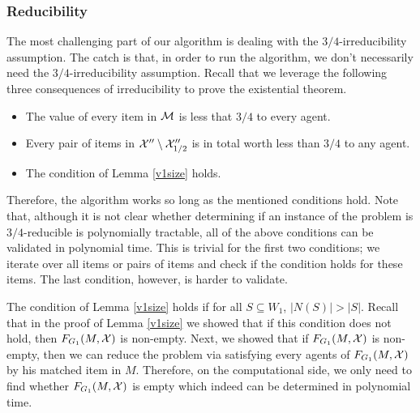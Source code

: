 \subsubsection{Reducibility}\label{irre}
The most challenging part of our algorithm is dealing with the $3/4$-irreducibility assumption. The catch is that, in order to run the algorithm, we don't necessarily need the $3/4$-irreducibility assumption. Recall that we leverage the following three consequences of irreducibility to prove the existential theorem.
\begin{itemize}
	\item The value of every item in $\mathcal{M}$ is less that $3/4$ to every agent.
	\item Every pair of items in $\mathcal{X}'' \setminus \mathcal{X}''_{1/2}$ is in total worth less than $3/4$ to any agent.
	\item The condition of Lemma \ref{v1size} holds.
\end{itemize}
 Therefore, the algorithm works so long as the mentioned conditions hold. Note that, although it is not clear whether determining if an instance of the problem is $3/4$-reducible is polynomially tractable, all of the above conditions can be validated in polynomial time. This is trivial for the first two conditions; we iterate over all items or pairs of items and check if the condition holds for these items. The last condition, however, is harder to validate.


The condition of Lemma \ref{v1size} holds if for all $S \subseteq W_1$, $|N(S)| > |S|$. Recall that in the proof of Lemma \ref{v1size} we showed that if this condition does not hold, then $F_{G_1}(M,\mathcal{X})$ is non-empty. Next, we showed that if $F_{G_1}(M,\mathcal{X})$ is non-empty, then we can reduce the problem via satisfying every agents of $F_{G_1}(M,\mathcal{X})$ by his matched item in $M$. Therefore, on the computational side, we only need to find whether $F_{G_1}(M,\mathcal{X})$ is empty which indeed can be determined in polynomial time. 

